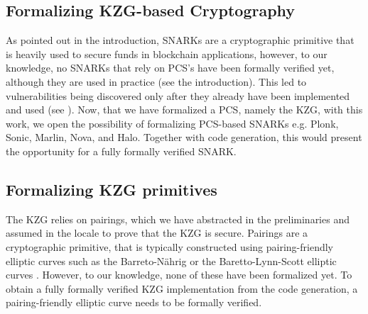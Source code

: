 \subsection*{Formalizing KZG-based Cryptography}
As pointed out in the introduction, SNARKs are a cryptographic primitive that is heavily used to secure funds in blockchain applications, however, to our knowledge, no SNARKs that rely on PCS's have been formally verified yet, although they are used in practice (see the introduction). This led to vulnerabilities being discovered only after they already have been implemented and used (see \parencite{FHBulletproofs}). Now, that we have formalized a PCS, namely the KZG, with this work, we open the possibility of formalizing PCS-based SNARKs e.g. Plonk, Sonic, Marlin, Nova, and Halo. Together with code generation, this would present the opportunity for a fully formally verified SNARK. 

\subsection*{Formalizing KZG primitives}
The KZG relies on pairings, which we have abstracted in the preliminaries and assumed in the locale to prove that the KZG is secure. Pairings are a cryptographic primitive, that is typically constructed using pairing-friendly elliptic curves such as the Barreto-Nährig\parencite{BN-EC} or the Baretto-Lynn-Scott\parencite{BLS-EC} elliptic curves \parencite{boneh_shoup}. However, to our knowledge, none of these have been formalized yet. To obtain a fully formally verified KZG implementation from the code generation, a pairing-friendly elliptic curve needs to be formally verified.